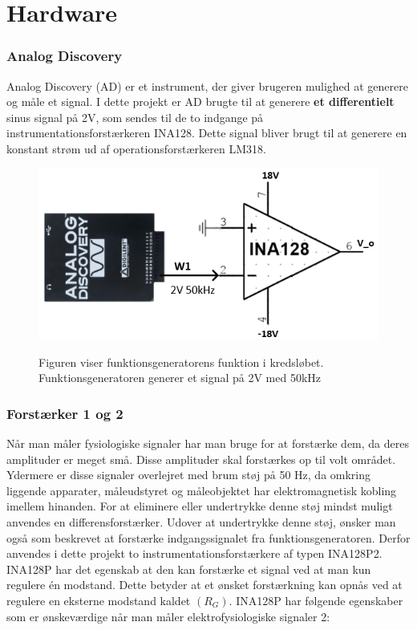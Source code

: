 \chapter{Hardware}

\subsection{Analog Discovery}
Analog Discovery (AD) er et instrument, der giver brugeren mulighed at generere og måle et signal. I dette projekt er AD brugte til at generere \textbf{et differentielt} sinus signal på 2V, som sendes til de to indgange på instrumentationsforstærkeren INA128. Dette signal bliver brugt til at generere en konstant strøm ud af operationsforstærkeren LM318. 
\begin{figure}[H]
\centering
{\includegraphics[width=\linewidth]
{Figure/ADogINA128}}
\caption{Figuren viser funktionsgeneratorens funktion i kredsløbet. Funktionsgeneratoren generer et signal på 2V med 50kHz}
\label{analogOgINA}
\end{figure}

\subsection{Forstærker 1 og 2}
Når man måler fysiologiske signaler har man bruge for at forstærke dem, da deres amplituder er meget små. Disse amplituder skal forstærkes op til volt området. Ydermere er disse signaler overlejret med brum støj på 50 Hz, da omkring liggende apparater, måleudstyret og måleobjektet har elektromagnetisk kobling imellem hinanden. For at eliminere eller undertrykke denne støj mindst muligt anvendes en differensforstærker. Udover at undertrykke denne støj, ønsker man også som beskrevet at forstærke indgangssignalet fra funktionsgeneratoren. Derfor anvendes i dette projekt to instrumentationsforstærkere af typen INA128P2. INA128P har det egenskab at den kan forstærke et signal ved at man kun regulere én modstand. Dette betyder at et ønsket forstærkning kan opnås ved at regulere  en eksterne modstand kaldet $(R_G)$. INA128P har følgende egenskaber som er ønskeværdige når man måler elektrofysiologiske signaler 2:


